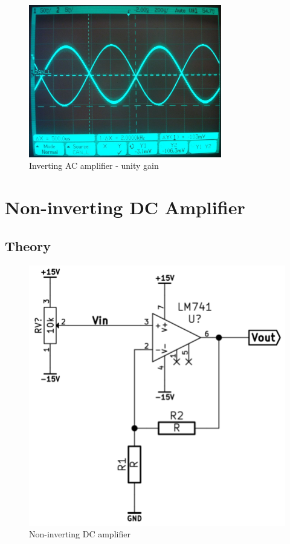 \documentclass[11pt,a4paper]{article}
\begin{document}
\begin{figure}[htbp]
    \centering
    \includegraphics[width=0.75\textwidth]{img/invACamp-x1.jpg}
    \caption{Inverting AC amplifier - unity gain}
    \label{fig:invACampunity_scope}
\end{figure}


\section{Non-inverting DC Amplifier}\label{non-inverting-dc-amplifier}

\subsection{Theory}\label{noninvDC-theory}

\begin{figure}[htbp]
    \centering
    \includegraphics[scale=0.5]{img/noninvDCamp.png}
    \caption{Non-inverting DC amplifier}
    \label{fig:noninvDCamp}
\end{figure}
\end{document}
